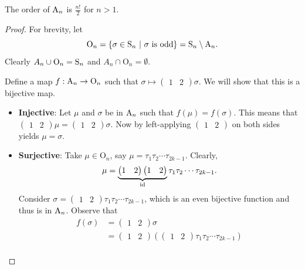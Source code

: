 \begin{proposition}\label{prop-order-of-An}
    The order of $\mathrm{A}_{n}$ is $\frac{n!}{2}$ for $n > 1$.
\end{proposition}
\begin{proof}
    For brevity, let
    \[
        \mathrm{O}_n = \left\{\sigma \in \Sn{n} \ | \ \sigma \text{ is odd}\right\} = \Sn{n} \setminus \An{n}.
    \]
    Clearly $A_n \cup \mathrm{O}_n = \mathrm{S}_{n}$ and $A_n \cap \mathrm{O}_n = \emptyset$.

    Define a map $f: \mathrm{A}_{n} \to \mathrm{O}_n$ such that $\sigma \mapsto \begin{pmatrix}1 & 2\end{pmatrix}\sigma$. We will show that this is a bijective map.
    \begin{itemize}
        \item \textbf{Injective}: Let $\mu$ and $\sigma$ be in $\mathrm{A}_{n}$ such that $f(\mu) = f(\sigma)$. This means that $\begin{pmatrix}1 & 2\end{pmatrix}\mu = \begin{pmatrix}1 & 2\end{pmatrix}\sigma$. Now by left-applying $\begin{pmatrix}1 & 2\end{pmatrix}$ on both sides yields $\mu = \sigma$.
        \item \textbf{Surjective}: Take $\mu \in \mathrm{O}_n$, say $\mu = \tau_1\tau_2\cdots\tau_{2k-1}$. Clearly,
        \[
            \mu = \underbrace{\begin{pmatrix}1 & 2\end{pmatrix}\begin{pmatrix}1 & 2\end{pmatrix}}_{\mathrm{id}}\tau_1\tau_2\cdots\tau_{2k-1}.
        \]
        Consider $\sigma = \begin{pmatrix}1 & 2\end{pmatrix}\tau_1\tau_2\cdots\tau_{2k-1}$, which is an even bijective function and thus is in $\mathrm{A}_{n}$. Observe that
        \begin{align*}
            f(\sigma) &= \begin{pmatrix}1 & 2\end{pmatrix}\sigma\\
            &= \begin{pmatrix}1 & 2\end{pmatrix}\left(\begin{pmatrix}1 & 2\end{pmatrix}\tau_1\tau_2\cdots\tau_{2k-1}\right)\\

\end{align*}
\end{itemize}
\end{proof}
